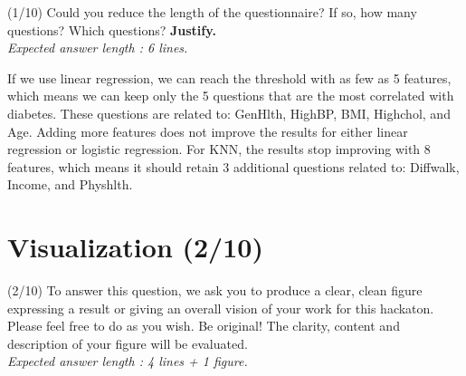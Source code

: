 \documentclass [a4paper, 11pt] {article}
\begin{document}
\begin{question}{2.4}
(1/10) Could you reduce the length of the questionnaire? If so, how many questions? Which questions? \textbf{Justify.}\\
\textit{Expected answer length : 6 lines.}
\end{question}
\begin{answer}\color{blue}
If we use linear regression, we can reach the threshold with as few as 5 features, which means we can keep only the 5 questions 
that are the most correlated with diabetes. These questions are related to: GenHlth, HighBP, BMI, Highchol, and Age. 
Adding more features does not improve the results for either linear regression or logistic regression. For KNN, the results 
stop improving with 8 features, which means it should retain 3 additional questions related to: Diffwalk, Income, and Physhlth.
\end{answer}


\section{Visualization (2/10)}

\begin{question}{3.1}
(2/10) To answer this question, we ask you to produce a clear, clean figure expressing a result or giving an overall vision of your work for this hackaton. Please feel free to do as you wish. Be original! The clarity, content and description of your figure will be evaluated.\\
\textit{Expected answer length : 4 lines + 1 figure.}
\end{question}
\begin{answer}\color{blue}
\end{answer}
\pagebreak
\end{document}
